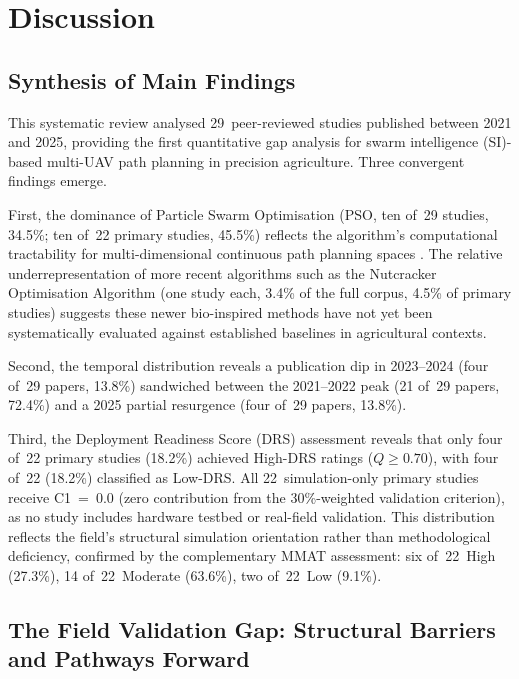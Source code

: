 \documentclass[review,3p]{elsarticle}
\begin{document}
\section{Discussion}

\subsection{Synthesis of Main Findings}
\label{subsec:synthesis}

This systematic review analysed 29~peer-reviewed studies published between
2021 and 2025, providing the first quantitative gap analysis for swarm
intelligence (SI)-based multi-UAV path planning in precision agriculture.
Three convergent findings emerge.

First, the dominance of Particle Swarm Optimisation (PSO, ten of~29 studies,
34.5\%; ten of~22 primary studies, 45.5\%) reflects the algorithm's
computational tractability for multi-dimensional continuous path planning
spaces \cite{puente2022,sharma2022}. The relative underrepresentation of more
recent algorithms such as the Nutcracker Optimisation Algorithm \cite{xiao2025}
(one study each, 3.4\% of the full corpus, 4.5\% of primary studies) suggests
these newer bio-inspired methods have not yet been systematically evaluated
against established baselines in agricultural contexts.

Second, the temporal distribution reveals a publication dip in 2023--2024
(four of~29 papers, 13.8\%) sandwiched between the 2021--2022 peak
(21 of~29 papers, 72.4\%) and a 2025 partial resurgence (four of~29 papers,
13.8\%).

Third, the Deployment Readiness Score (DRS) assessment reveals that only
four of~22 primary studies (18.2\%) achieved High-DRS ratings ($Q \geq 0.70$),
with four of~22 (18.2\%) classified as Low-DRS. All 22~simulation-only primary
studies receive C1~=~0.0 (zero contribution from the 30\%-weighted validation
criterion), as no study includes hardware testbed or real-field validation.
This distribution reflects the field's structural simulation orientation
rather than methodological deficiency, confirmed by the complementary MMAT
assessment: six of~22~High (27.3\%), 14 of~22~Moderate (63.6\%),
two of~22~Low (9.1\%).

\subsection{The Field Validation Gap: Structural Barriers and Pathways Forward}
\label{subsec:field_validation_gap}
\end{document}
